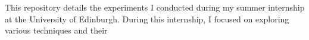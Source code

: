 This repository details the experiments I conducted during my summer internship at the University of Edinburgh.
During this internship, I focused on exploring various techniques and their 